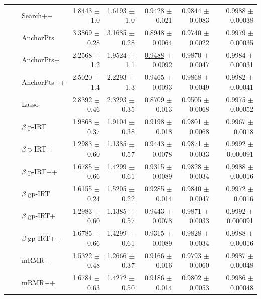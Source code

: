 \begin{longtable}{llp{}rrrrr}
 &  & Search++ & 1.8443 {\scriptsize $\pm$ 1.0} & 1.6193 {\scriptsize $\pm$ 1.0} & 0.9428 {\scriptsize $\pm$ 0.021} & 0.9844 {\scriptsize $\pm$ 0.0083} & 0.9988 {\scriptsize $\pm$ 0.00038} \\
 &  & AnchorPts & 3.3869 {\scriptsize $\pm$ 0.28} & 3.1685 {\scriptsize $\pm$ 0.28} & 0.8948 {\scriptsize $\pm$ 0.0064} & 0.9740 {\scriptsize $\pm$ 0.0022} & 0.9979 {\scriptsize $\pm$ 0.00035} \\
 &  & AnchorPts+ & 2.2568 {\scriptsize $\pm$ 1.2} & 1.9524 {\scriptsize $\pm$ 1.1} & \underline{0.9488} {\scriptsize $\pm$ 0.0092} & 0.9870 {\scriptsize $\pm$ 0.0047} & 0.9984 {\scriptsize $\pm$ 0.00031} \\
 &  & AnchorPts++ & 2.5020 {\scriptsize $\pm$ 1.4} & 2.2293 {\scriptsize $\pm$ 1.3} & 0.9465 {\scriptsize $\pm$ 0.0093} & 0.9868 {\scriptsize $\pm$ 0.0049} & 0.9982 {\scriptsize $\pm$ 0.00041} \\
 &  & Lasso & 2.8392 {\scriptsize $\pm$ 0.46} & 2.3293 {\scriptsize $\pm$ 0.35} & 0.8709 {\scriptsize $\pm$ 0.013} & 0.9505 {\scriptsize $\pm$ 0.0068} & 0.9975 {\scriptsize $\pm$ 0.00052} \\
 &  & $\beta$ p-IRT & 1.9868 {\scriptsize $\pm$ 0.37} & 1.9104 {\scriptsize $\pm$ 0.38} & 0.9198 {\scriptsize $\pm$ 0.018} & 0.9801 {\scriptsize $\pm$ 0.0068} & 0.9967 {\scriptsize $\pm$ 0.0018} \\
 &  & $\beta$ p-IRT+ & \underline{1.2983} {\scriptsize $\pm$ 0.60} & \underline{1.1385} {\scriptsize $\pm$ 0.57} & 0.9443 {\scriptsize $\pm$ 0.0078} & \underline{0.9871} {\scriptsize $\pm$ 0.0033} & 0.9992 {\scriptsize $\pm$ 0.000091} \\
 &  & $\beta$ p-IRT++ & 1.6785 {\scriptsize $\pm$ 0.66} & 1.4299 {\scriptsize $\pm$ 0.61} & 0.9315 {\scriptsize $\pm$ 0.0089} & 0.9828 {\scriptsize $\pm$ 0.0034} & 0.9988 {\scriptsize $\pm$ 0.00016} \\
 &  & $\beta$ gp-IRT & 1.6155 {\scriptsize $\pm$ 0.24} & 1.5205 {\scriptsize $\pm$ 0.22} & 0.9285 {\scriptsize $\pm$ 0.014} & 0.9840 {\scriptsize $\pm$ 0.0047} & 0.9972 {\scriptsize $\pm$ 0.0016} \\
 &  & $\beta$ gp-IRT+ & 1.2983 {\scriptsize $\pm$ 0.60} & 1.1385 {\scriptsize $\pm$ 0.57} & 0.9443 {\scriptsize $\pm$ 0.0078} & 0.9871 {\scriptsize $\pm$ 0.0033} & 0.9992 {\scriptsize $\pm$ 0.000091} \\
 &  & $\beta$ gp-IRT++ & 1.6785 {\scriptsize $\pm$ 0.66} & 1.4299 {\scriptsize $\pm$ 0.61} & 0.9315 {\scriptsize $\pm$ 0.0089} & 0.9828 {\scriptsize $\pm$ 0.0034} & 0.9988 {\scriptsize $\pm$ 0.00016} \\
 &  & mRMR+ & 1.5322 {\scriptsize $\pm$ 0.48} & 1.2666 {\scriptsize $\pm$ 0.37} & 0.9166 {\scriptsize $\pm$ 0.016} & 0.9793 {\scriptsize $\pm$ 0.0060} & 0.9987 {\scriptsize $\pm$ 0.00048} \\
 &  & mRMR++ & 1.6784 {\scriptsize $\pm$ 0.63} & 1.4272 {\scriptsize $\pm$ 0.50} & 0.9186 {\scriptsize $\pm$ 0.014} & 0.9802 {\scriptsize $\pm$ 0.0053} & 0.9986 {\scriptsize $\pm$ 0.00048} \\
\end{longtable}